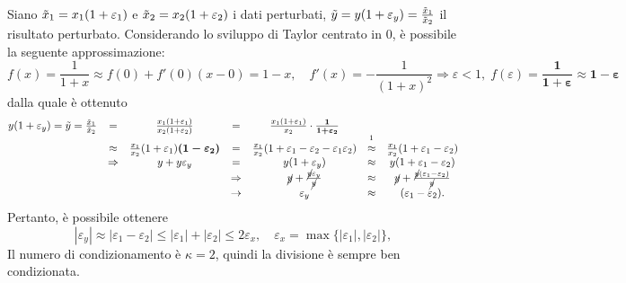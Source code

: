 Siano $\Tilde{x}_1=x_1(1+\varepsilon_1)$ e $ \Tilde{x}_2=x_2(1+\varepsilon_2)$ i dati perturbati,  $\Tilde{y}= y(1+\varepsilon_y)=\frac{\Tilde{x}_1}{\Tilde{x}_2}$ il risultato perturbato. Considerando lo sviluppo di Taylor centrato in 0, è possibile la seguente approssimazione:
\begin{equation*}
	f(x)=\frac{1}{1+x}\approx f(0)+f'(0)(x-0)=1-x,\quad f'(x)=-\frac{1}{(1+x)^2}\Rightarrow \varepsilon<1,\;f(\varepsilon)=\boldsymbol{\frac{1}{1+\varepsilon}\approx1-\varepsilon}
\end{equation*}
dalla quale è ottenuto
\begin{equation*}
	\begin{matrix}
		y(1+\varepsilon_y)=\Tilde{y}=\frac{\Tilde{x}_1}{\Tilde{x}_2}&=&\frac{x_1(1+\varepsilon_1)}{x_2(1+\varepsilon_2)}&=&\frac{x_1(1+\varepsilon_1)}{x_2}\cdot\boldsymbol{\frac{1}{1+\varepsilon_2}}\\
		&\approx&\frac{x_1}{x_2}(1+\varepsilon_1)\boldsymbol{(1-\varepsilon_2)}&=&\frac{x_1}{x_2}(1+\varepsilon_1-\varepsilon_2-\varepsilon_1\varepsilon_2) &\overset{\footnotemark}{\approx}&\frac{x_1}{x_2}(1+\varepsilon_1-\varepsilon_2)\\
		&\Rightarrow&  y+y\varepsilon_y&=&y(1+\varepsilon_y)&\approx&y(1+\varepsilon_1-\varepsilon_2)\\
		&&&\Rightarrow& \cancel{y}+\frac{\cancel{y}\varepsilon_y}{\cancel{y}}&\approx&\cancel{y}+\frac{\cancel{y}(\varepsilon_1-\varepsilon_2)}{\cancel{y}}\\
		&&&\rightarrow& \varepsilon_y &\approx& (\varepsilon_1-\varepsilon_2).
	\end{matrix}
\end{equation*}
Pertanto, è possibile ottenere
\begin{equation*}
	|\varepsilon_y|\approx|\varepsilon_1-\varepsilon_2|\leq |\varepsilon_1|+|\varepsilon_2|\leq 2\varepsilon_x,\quad \varepsilon_x=\max\{|\varepsilon_1|,|\varepsilon_2|\},
\end{equation*}
Il numero di condizionamento è $\kappa=2$, quindi la divisione è sempre ben condizionata.